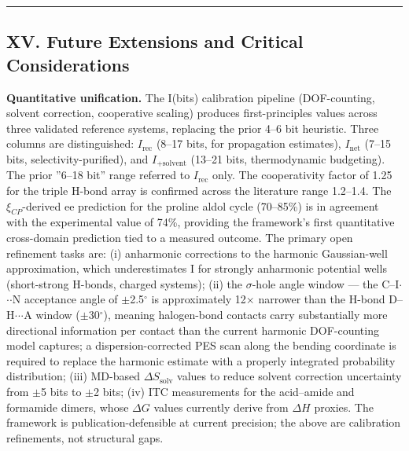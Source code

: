 \documentclass[12pt,a4paper]{article}
\begin{document}
\begin{center}
\rule{0.5\textwidth}{0.4pt}
\end{center}

\subsection{XV. Future Extensions and Critical Considerations}

\textbf{Quantitative unification.} The I(bits) calibration pipeline (DOF-counting, solvent correction, cooperative scaling) produces first-principles values across three validated reference systems, replacing the prior 4--6 bit heuristic. Three columns are distinguished: $I_\text{rec}$ (8--17 bits, for propagation estimates), $I_\text{net}$ (7--15 bits, selectivity-purified), and $I_\text{+solvent}$ (13--21 bits, thermodynamic budgeting). The prior ''6--18 bit'' range referred to $I_\text{rec}$ only. The cooperativity factor of 1.25 for the triple H-bond array is confirmed across the literature range 1.2--1.4. The $\xi_{CP}$-derived ee prediction for the proline aldol cycle (70--85\%) is in agreement with the experimental value of 74\%, providing the framework's first quantitative cross-domain prediction tied to a measured outcome. The primary open refinement tasks are: (i) anharmonic corrections to the harmonic Gaussian-well approximation, which underestimates I for strongly anharmonic potential wells (short-strong H-bonds, charged systems); (ii) the $\sigma$-hole angle window --- the C--I$\cdot$$\cdot$$\cdot$N acceptance angle of $\pm$2.5$^{\circ}$ is approximately 12$\times$ narrower than the H-bond D--H$\cdot$$\cdot$$\cdot$A window ($\pm$30$^{\circ}$), meaning halogen-bond contacts carry substantially more directional information per contact than the current harmonic DOF-counting model captures; a dispersion-corrected PES scan along the bending coordinate is required to replace the harmonic estimate with a properly integrated probability distribution; (iii) MD-based $\Delta S_{\text{solv}}$ values to reduce solvent correction uncertainty from $\pm$5 bits to $\pm$2 bits; (iv) ITC measurements for the acid--amide and formamide dimers, whose $\Delta G$ values currently derive from $\Delta H$ proxies. The framework is publication-defensible at current precision; the above are calibration refinements, not structural gaps.
\end{document}
